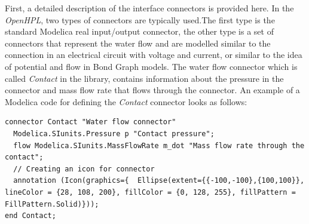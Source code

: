 \documentclass[%
]{USN-PhD}
\begin{document}
First, a detailed description of the interface connectors is provided here. In the \emph{OpenHPL}, two types of connectors are typically used.The first type is the standard Modelica real input/output connector, the other type is a set of connectors that represent the water flow and are modelled similar to the connection in an electrical circuit with voltage and current, or similar to the idea of potential and flow in Bond Graph models. The water flow connector which is called \emph{Contact} in the library, contains information about the pressure in the connector and mass flow rate that flows through the connector. An example of a Modelica code for defining the \emph{Contact} connector looks as follows:

\begin{lstlisting}[language = modelica]
connector Contact "Water flow connector"
  Modelica.SIunits.Pressure p "Contact pressure";
  flow Modelica.SIunits.MassFlowRate m_dot "Mass flow rate through the contact";
  // Creating an icon for connector
  annotation (Icon(graphics={  Ellipse(extent={{-100,-100},{100,100}}, lineColor = {28, 108, 200}, fillColor = {0, 128, 255}, fillPattern = FillPattern.Solid)}));
end Contact;
\end{lstlisting}
\end{document}
